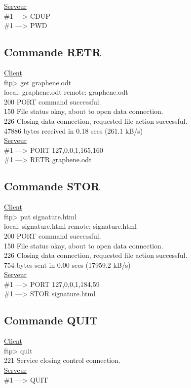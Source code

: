 \underline{Serveur}\\
\#1 ---> CDUP\\
\#1 ---> PWD

\subsection*{Commande RETR}

\underline{Client}\\
ftp> get graphene.odt\\
local: graphene.odt remote: graphene.odt\\
200 PORT command successful.\\
150 File status okay, about to open data connection.\\
226 Closing data connection, requested file action successful.\\
47886 bytes received in 0.18 secs (261.1 kB/s)\\

\underline{Serveur}\\
\#1 ---> PORT 127,0,0,1,165,160\\
\#1 ---> RETR graphene.odt

\subsection*{Commande STOR}

\underline{Client}\\
ftp> put signature.html\\
local: signature.html remote: signature.html\\
200 PORT command successful.\\
150 File status okay, about to open data connection.\\
226 Closing data connection, requested file action successful.\\
754 bytes sent in 0.00 secs (17959.2 kB/s)\\

\underline{Serveur}\\
\#1 ---> PORT 127,0,0,1,184,59\\
\#1 ---> STOR signature.html

\subsection*{Commande QUIT}

\underline{Client}\\
ftp> quit\\
221 Service closing control connection.\\

\underline{Serveur}\\
\#1 ---> QUIT

